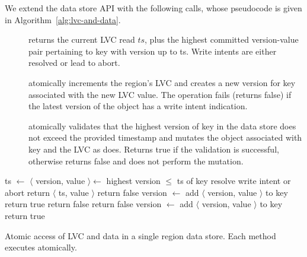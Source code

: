 We extend the data store API with the following calls, whose 
pseudocode is given in Algorithm~\ref{alg:lvc-and-data}. 

\begin{description}
   \item []  returns the current LVC read $ts$, plus the highest committed version-value pair pertaining to key with version up to ts.
   Write intents are either resolved or lead to abort.
   \item[] atomically increments the region's LVC
  and creates a new version for key associated with the new LVC value. The
  operation fails (returns false) if the latest version of the object has a write intent indication. 
   \item []
atomically validates that the  highest version of key in the data store does not exceed the provided timestamp
and mutates the  object associated with key and the LVC as  does. Returns true if the
validation is successful, otherwise returns false and does not perform the mutation. 
\end{description}

\begin{algorithm}[htb]
\begin{algorithmic}
\State ts $\leftarrow$ 
\State $\langle$ version, value $\rangle \leftarrow$ highest version  $\leq$ ts of key
	\State resolve write intent or abort
\EndIf
\State return $\langle$ ts, value $\rangle$ 
\EndProcedure
\Statex
%
\State return false
\EndIf
\State  version $\leftarrow$ 
\State add $\langle$ version, value $\rangle$ to key
\State return true
\EndProcedure
\Statex
%
	\State return false
\EndIf
{}
	\State return false
\EndIf
{}
\State  version $\leftarrow$ 
\State add $\langle$ version, value $\rangle$ to key
\State return true
\EndProcedure
%
\end{algorithmic}
\caption{Atomic access of LVC and data in a single region data store. Each method executes atomically.}
\label{alg:lvc-and-data}
\end{algorithm}


